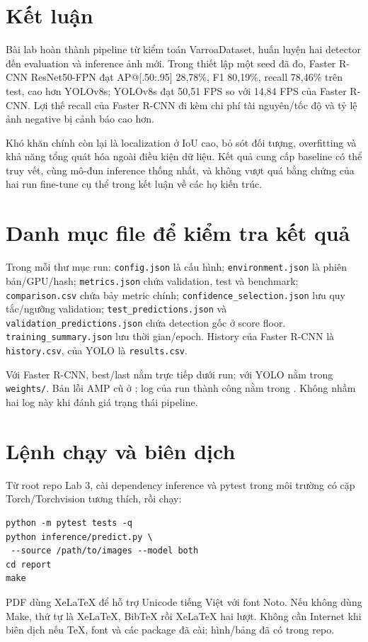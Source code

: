 \documentclass[a4paper,10pt,twocolumn]{article}
\newcommand{\FR}{Faster R-CNN}
\newcommand{\YO}{YOLOv8s}
\begin{document}
\section{Kết luận}
Bài lab hoàn thành pipeline từ kiểm toán VarroaDataset, huấn luyện hai detector đến
evaluation và inference ảnh mới. Trong thiết lập một seed đã đo, \FR{} ResNet50-FPN
đạt AP@[.50:.95] 28,78\%, F1 80,19\%, recall 78,46\% trên test, cao hơn \YO{};
\YO{} đạt 50,51 FPS so với 14,84 FPS của \FR{}. Lợi thế recall của \FR{} đi kèm
chi phí tài nguyên/tốc độ và tỷ lệ ảnh negative bị cảnh báo cao hơn.

Khó khăn chính còn lại là localization ở IoU cao, bỏ sót đối tượng, overfitting và
khả năng tổng quát hóa ngoài điều kiện dữ liệu. Kết quả cung cấp baseline có thể
truy vết, cùng mô-đun inference thống nhất, và không vượt quá bằng chứng của hai run
fine-tune cụ thể trong kết luận về các họ kiến trúc.

\appendix
\section{Danh mục file để kiểm tra kết quả}
Trong mỗi thư mục run: \texttt{config.json} là cấu hình; \texttt{environment.json}
là phiên bản/GPU/hash; \texttt{metrics.json} chứa validation, test và benchmark;
\texttt{comparison.csv} chứa bảy metric chính; \texttt{confidence\_selection.json}
lưu quy tắc/ngưỡng validation; \texttt{test\_predictions.json} và
\texttt{validation\_predictions.json} chứa detection gốc ở score floor.
\texttt{training\_summary.json} lưu thời gian/epoch. History của \FR{} là
\texttt{history.csv}, của YOLO là \texttt{results.csv}.

Với \FR{}, best/last nằm trực tiếp dưới run; với YOLO nằm trong
\texttt{weights/}. Bản lỗi AMP cũ ở ; log của
run thành công nằm trong . Không nhầm hai log này khi
đánh giá trạng thái pipeline.

\section{Lệnh chạy và biên dịch}
Từ root repo Lab 3, cài dependency inference và pytest trong môi trường có cặp
Torch/Torchvision tương thích, rồi chạy:
\begin{lstlisting}
python -m pytest tests -q
python inference/predict.py \
 --source /path/to/images --model both
cd report
make
\end{lstlisting}
PDF dùng XeLaTeX để hỗ trợ Unicode tiếng Việt với font Noto. Nếu không dùng Make,
thứ tự là XeLaTeX, BibTeX rồi XeLaTeX hai lượt. Không cần Internet khi biên dịch
nếu TeX, font và các package đã cài; hình/bảng đã có trong repo.



\end{document}
